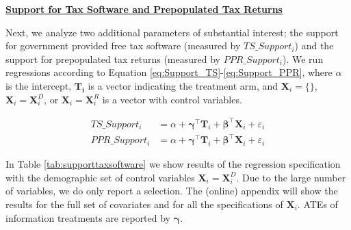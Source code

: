 \documentclass[11pt]{article}
\begin{document}
\FloatBarrier
\begin{center}\textbf{\underline{Support for Tax Software and Prepopulated Tax Returns}}\end{center}
Next, we analyze two additional parameters of substantial interest; the support for government provided free tax software (measured by $TS\_Support_i$) and the support for prepopulated tax returns (measured by $PPR\_Support_i$). We run regressions according to Equation \ref{eq:Support_TS}-\ref{eq:Support_PPR}, where $\alpha$ is the intercept, $\mathbf{T_i}$ is a vector indicating the treatment arm, and $\mathbf{X}_{i} = \{\}$, $\mathbf{X}_{i} = \mathbf{X}_{i}^{D}$, or  $\mathbf{X}_{i} = \mathbf{X}_{i}^{R}$ is a vector with control variables. 
\begin{center}
\begin{align}
    \label{eq:Support_TS}
    \text{$TS\_Support_i$} 
    &= \alpha + \boldsymbol{\gamma}^{\top}\mathbf{T}_i + \boldsymbol{\beta}^{\top}\mathbf{X}_{i} + \varepsilon_{i} \\[0.25em]
    \label{eq:Support_PPR}
    \text{$PPR\_Support_i$} 
    &= \alpha + \boldsymbol{\gamma}^{\top}\mathbf{T}_i + \boldsymbol{\beta}^{\top}\mathbf{X}_{i} +  \varepsilon_{i} 
\end{align}
\end{center}

In Table \ref{tab:supporttaxsoftware} we show results of the regression specification with the demographic set of control variables $\mathbf{X}_{i} = \mathbf{X}_{i}^{D}$. Due to the large number of variables, we do only report a selection. The (online) appendix will show the results for the full set of covariates and for all the specifications of $\mathbf{X}_{i}$. ATEs of information treatments are reported by $\boldsymbol{\gamma}$.
\end{document}

